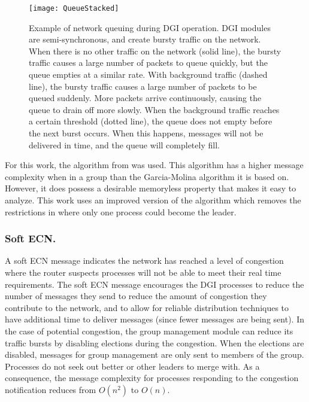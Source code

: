 \begin{figure}
\centering
\texttt{[image: QueueStacked]}
\caption{
Example of network queuing during \ac{DGI} operation. \ac{DGI} modules are semi-synchronous, and create bursty traffic on the network.
When there is no other traffic on the network (solid line), the bursty traffic causes a large number of packets to queue quickly, but the queue empties at a similar rate.
With background traffic (dashed line), the bursty traffic causes a large number of packets to be queued suddenly. More packets arrive continuously, causing the queue to drain off more slowly.
When the background traffic reaches a certain threshold (dotted line), the queue does not empty before the next burst occurs. When this happens, messages will not be delivered in time, and the queue will completely fill.
}
\label{fig:queue-types}
\end{figure}

For this work, the algorithm from \cite{JOURNAL} was used.
This algorithm has a higher message complexity when in a group than the Garcia-Molina algorithm it is based on.
However, it does possess a desirable memoryless property that makes it easy to analyze.
This work uses an improved version of the algorithm which removes the restrictions in \cite{JOURNAL} where only one process could become the leader.

\subsubsection{Soft \ac{ECN}.}

A soft \ac{ECN} message indicates the network has reached a level of congestion where the router suspects processes will not be able to meet their real time requirements.
The soft \ac{ECN} message encourages the \ac{DGI} processes to reduce the number of messages they send to reduce the amount of congestion they contribute to the network, and to allow for reliable distribution techniques to have additional time to deliver messages (since fewer messages are being sent).
In the case of potential congestion, the group management module can reduce its traffic bursts by disabling elections during the congestion.
When the elections are disabled, messages for group management are only sent to members of the group.
Processes do not seek out better or other leaders to merge with.
As a consequence, the message complexity for processes responding to the congestion notification reduces from $O(n^2)$ to $O(n)$.

